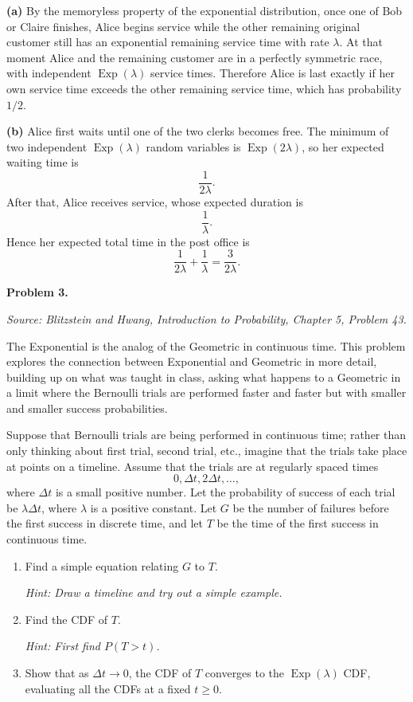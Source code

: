 \documentclass[11pt]{article}
\newcommand{\source}[2]{%
    \vspace{0.15cm}
    {\small\textit{Source: Blitzstein and Hwang, \textit{Introduction to Probability}, Chapter #1, Problem #2.}}
}
\begin{document}
\begin{solutionbox}
\textbf{(a)} By the memoryless property of the exponential distribution, once one of Bob or Claire finishes, Alice begins service while the other remaining original customer still has an exponential remaining service time with rate $\lambda$. At that moment Alice and the remaining customer are in a perfectly symmetric race, with independent $\operatorname{Exp}(\lambda)$ service times. Therefore Alice is last exactly if her own service time exceeds the other remaining service time, which has probability $1/2$.
 

\textbf{(b)} Alice first waits until one of the two clerks becomes free. The minimum of two independent $\operatorname{Exp}(\lambda)$ random variables is $\operatorname{Exp}(2\lambda)$, so her expected waiting time is
\[
\frac{1}{2\lambda}.
\]
After that, Alice receives service, whose expected duration is
\[
\frac{1}{\lambda}.
\]
Hence her expected total time in the post office is
\[
\frac{1}{2\lambda}+\frac{1}{\lambda}=\frac{3}{2\lambda}.
\]
 
\end{solutionbox}
\newpage


\begin{problemheader}
\textbf{Problem 3.}
\end{problemheader}
\source{5}{43}

The Exponential is the analog of the Geometric in continuous time. This problem explores the connection between Exponential and Geometric in more detail, building up on what was taught in class, asking what happens to a Geometric in a limit where the Bernoulli trials are performed faster and faster but with smaller and smaller success probabilities.

Suppose that Bernoulli trials are being performed in continuous time; rather than only thinking about first trial, second trial, etc., imagine that the trials take place at points on a timeline. Assume that the trials are at regularly spaced times
\[
0,\Delta t,2\Delta t,\dots,
\]
where $\Delta t$ is a small positive number. Let the probability of success of each trial be $\lambda \Delta t$, where $\lambda$ is a positive constant. Let $G$ be the number of failures before the first success in discrete time, and let $T$ be the time of the first success in continuous time.

\begin{enumerate}[label=(\alph*), leftmargin=*]
    \item Find a simple equation relating $G$ to $T$.

    \emph{Hint: Draw a timeline and try out a simple example.}

    \item Find the CDF of $T$.

    \emph{Hint: First find $P(T>t)$.}

    \item Show that as $\Delta t\to0$, the CDF of $T$ converges to the $\operatorname{Exp}(\lambda)$ CDF, evaluating all the CDFs at a fixed $t\ge0$.

 
\end{enumerate}
\end{document}
